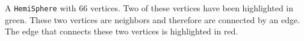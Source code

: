\label{fig:hemiSphere} A \verb|HemiSphere| with 66 vertices. Two of these vertices have been highlighted in green. These two vertices are neighbors and therefore are connected by an edge. The edge that connects these two vertices is highlighted in red.